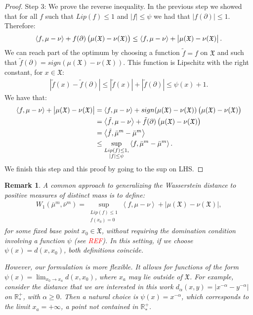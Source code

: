 \documentclass[11pt,a4paper]{article}
\newcommand{\RRP}{\mathbb{R}^+_*}
\newcommand{\XF}{\mathfrak{X}}
\newcommand{\brac}[1]{\left\langle#1\right\rangle}
\newtheorem{remark}[theorem]{Remark}
\begin{document}
\begin{proof}
    Step $3$: We prove the reverse inequality. In the previous step we showed that for all $f$ such that $Lip(f) \leq 1$ and $|f| \leq \psi$ we had that $|f(\partial)| \leq 1$. Therefore:
    \begin{align*}
        \brac{f,\mu - \nu} + f(\partial) \left(\mu(\XF) - \nu(\XF)\vphantom{A^2}\right) \leq \brac{f,\mu - \nu} + \left|\mu(\XF) - \nu(\XF)\vphantom{A^2}\right|.
    \end{align*}
    We can reach part of the optimum by choosing a function $\tilde{f} = f$ on $\XF$ and such that $\tilde{f}(\partial) = sign(\mu(\XF) - \nu(\XF))$. This function is Lipschitz with the right constant, for $x \in \XF$:
    \begin{align*}
        \left|\tilde{f}(x) - \tilde{f}(\partial)\right| \leq  \left|\tilde{f}(x)\right| + \left|\tilde{f}(\partial)\right| \leq \psi(x) + 1.
    \end{align*}
    We have that:
    \begin{align*}
        \brac{f,\mu - \nu} + \left|\vphantom{A^2}\mu(\XF) - \nu(\XF) \right| &= \brac{f,\mu - \nu} + sign(\mu(\XF) - \nu(\XF))\left(\vphantom{A^2}\mu(\XF) - \nu(\XF) \right)\\
        &=  \brac{\tilde{f},\mu - \nu} + \tilde{f}(\partial)\left(\vphantom{A^2}\mu(\XF) - \nu(\XF) \right)\\
        &= \brac{\tilde{f},\bar{\mu}^m - \bar{\mu}^m} \\
        &\leq \sup\limits_{\substack{Lip(f) \leq 1,\\ |f| \leq \psi}} \brac{f,\bar{\mu}^m - \bar{\mu}^m} .
    \end{align*}
    We finish this step and this proof by going to the sup on LHS.
\end{proof}
\begin{remark}
A common approach to generalizing the Wasserstein distance to positive measures of distinct mass is to define:
\begin{align*}
    W_1(\bar{\mu}^m, \bar{\nu}^m) = \sup_{\substack{Lip(f) \leq 1\\ f(x_0) = 0}} \brac{f, \mu - \nu} + \left| \mu(\XF) - \nu(\XF) \right|,
\end{align*}
for some fixed base point $x_0 \in \XF$, without requiring the domination condition involving a function $\psi$ (see \textcolor{red}{REF}). In this setting, if we choose $\psi(x) = d(x, x_0)$, both definitions coincide.

However, our formulation is more flexible. It allows for functions of the form $\psi(x) = \lim_{x_0 \to x_a} d(x, x_0)$, where $x_a$ may lie outside of $\XF$. For example, consider the distance that we are interested in this work \(d_\alpha(x, y) = |x^{-\alpha} - y^{-\alpha}|\) on \(\RRP\), with \(\alpha \geq 0\). Then a natural choice is \(\psi(x) = x^{-\alpha}\), which corresponds to the limit \(x_a = +\infty\), a point not contained in \(\RRP\).
\end{remark}
\end{document}
